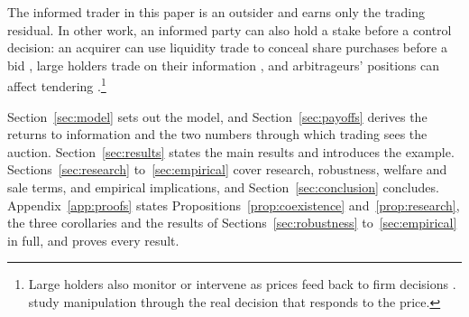 The informed trader in this paper is an outsider and earns only the trading residual. In other work, an informed
party can also hold a stake before a control decision: an acquirer can use
liquidity trade to conceal share purchases before a bid \citep{KyleVila1991}, large holders trade on their
information \citep{Edmans2009}, and arbitrageurs' positions can affect tendering
\citep{CornelliLi2002}.\footnote{Large holders also monitor or intervene as prices feed back to firm decisions
\citetext{\citealp[Section~II.E]{EdmansGoldsteinJiang2015}; \citealp{Maug1998}; \citealp{BackEtAl2018}}.
\citet{GoldsteinGuembel2008} study manipulation through the real decision that responds to the price.}

Section~\ref{sec:model} sets out the model, and Section~\ref{sec:payoffs} derives the returns to information and the
two numbers through which trading sees the auction. Section~\ref{sec:results} states the main results and introduces
the example. Sections~\ref{sec:research} to~\ref{sec:empirical} cover research, robustness, welfare and sale terms,
and empirical implications, and Section~\ref{sec:conclusion} concludes. Appendix~\ref{app:proofs} states
Propositions~\ref{prop:coexistence} and~\ref{prop:research}, the three corollaries and the results of
Sections~\ref{sec:robustness} to~\ref{sec:empirical} in full, and proves every result.
